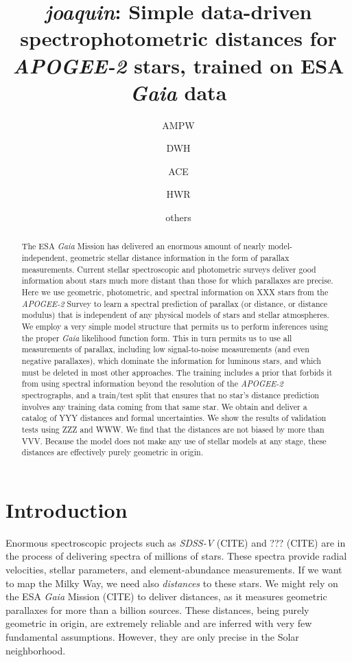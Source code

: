 \documentclass[modern]{aastex631}
\newcommand{\acronym}[1]{{\small{#1}}}
\newcommand{\project}[1]{\textsl{#1}}
\newcommand{\joaquin}{\project{joaquin}}
\newcommand{\ESA}{\acronym{ESA}}
\newcommand{\Gaia}{\project{Gaia}}
\newcommand{\APOGEE}{\project{\acronym{APOGEE-2}}}
\newcommand{\SDSSV}{\project{\acronym{SDSS-V}}}
\begin{document}
\title{\joaquin{}: Simple data-driven spectrophotometric distances for \APOGEE{} stars, trained on \ESA{} \Gaia{} data}

\author{AMPW}

\author{DWH}

\author{ACE}

\author{HWR}

\author{others}

\begin{abstract}\noindent
The \ESA{} \Gaia{} Mission has delivered an enormous amount of nearly
model-independent, geometric stellar distance information in the form
of parallax measurements.
Current stellar spectroscopic and photometric surveys deliver
good information about stars much more distant than those for which
parallaxes are precise.
Here we use geometric, photometric, and spectral information on XXX
stars from the \APOGEE{} Survey to learn a spectral prediction of
parallax (or distance, or distance modulus) that is independent of
any physical models of stars and stellar atmospheres.
We employ a very simple model structure that permits us to perform
inferences using the proper \Gaia{} likelihood function form.
This in turn permits us to use all measurements of parallax, including
low signal-to-noise measurements (and even negative parallaxes), which
dominate the information for luminous stars, and which must be deleted
in most other approaches.
The training includes a prior that forbids it from using spectral
information beyond the resolution of the \APOGEE{} spectrographs,
and a train/test split that ensures that no star's distance prediction
involves any training data coming from that same star.
We obtain and deliver a catalog of YYY distances and formal uncertainties.
We show the results of validation tests using ZZZ and WWW.
We find that the distances are not biased by more than VVV.
Because the model does not make any use of stellar models at any
stage, these distances are effectively purely geometric in origin.
\end{abstract}


\section{Introduction}\label{sec:intro}

Enormous spectroscopic projects such as \SDSSV{} (CITE)
and ??? (CITE)
are in the process of delivering spectra of millions of stars.
These spectra provide radial velocities, stellar parameters, and element-abundance
measurements.
If we want to map the Milky Way, we need also \emph{distances} to these stars.
We might rely on the ESA \Gaia{} Mission (CITE) to deliver distances, as it measures
geometric parallaxes for more than a billion sources.
These distances, being purely geometric in origin, are extremely reliable
and are inferred with very few fundamental assumptions.
However, they are only precise in the Solar neighborhood.
\end{document}

